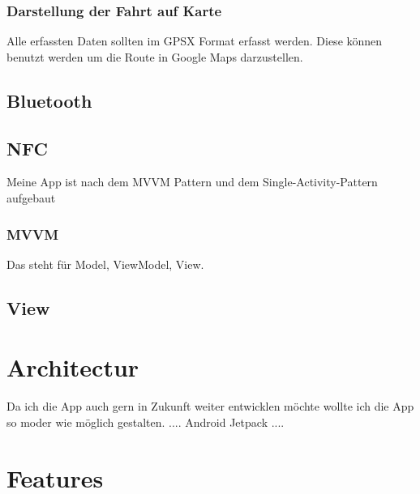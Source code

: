 \documentclass[a4paper]{article}
\begin{document}
\subsubsection{Darstellung der Fahrt auf Karte}
Alle erfassten Daten sollten im GPSX Format erfasst werden. 
Diese können benutzt werden um die Route in Google Maps darzustellen.


\subsection{Bluetooth}

\subsection{NFC}
Meine App ist nach dem MVVM Pattern und dem Single-Activity-Pattern aufgebaut

\subsubsection{MVVM}
Das steht für Model, ViewModel, View. 


\subsection{View}

\section{Architectur}
Da ich die App auch gern in Zukunft weiter entwicklen möchte wollte ich die App so moder wie möglich gestalten.
....
Android Jetpack
....


\section{Features}
\end{document}
